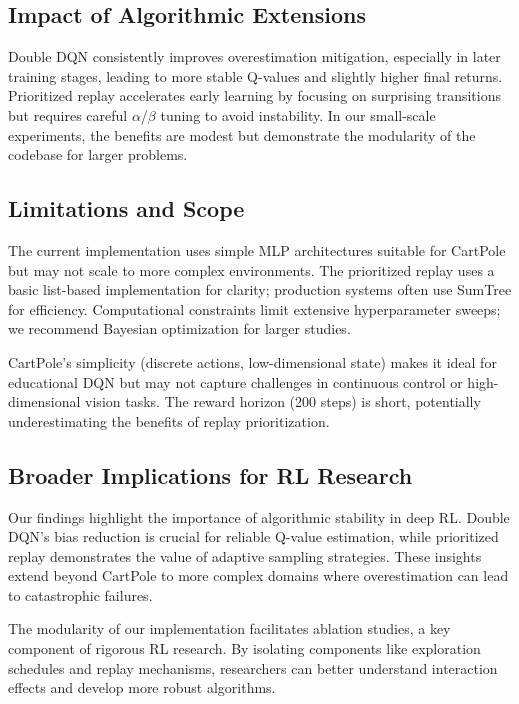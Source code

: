 \documentclass{IEEEtran}
\begin{document}
\subsection{Impact of Algorithmic Extensions}

Double DQN consistently improves overestimation mitigation, especially in later training stages, leading to more stable Q-values and slightly higher final returns. Prioritized replay accelerates early learning by focusing on surprising transitions but requires careful $\alpha$/$\beta$ tuning to avoid instability. In our small-scale experiments, the benefits are modest but demonstrate the modularity of the codebase for larger problems.

\subsection{Limitations and Scope}

The current implementation uses simple MLP architectures suitable for CartPole but may not scale to more complex environments. The prioritized replay uses a basic list-based implementation for clarity; production systems often use SumTree for efficiency. Computational constraints limit extensive hyperparameter sweeps; we recommend Bayesian optimization for larger studies.

CartPole's simplicity (discrete actions, low-dimensional state) makes it ideal for educational DQN but may not capture challenges in continuous control or high-dimensional vision tasks. The reward horizon (200 steps) is short, potentially underestimating the benefits of replay prioritization.

\subsection{Broader Implications for RL Research}

Our findings highlight the importance of algorithmic stability in deep RL. Double DQN's bias reduction is crucial for reliable Q-value estimation, while prioritized replay demonstrates the value of adaptive sampling strategies. These insights extend beyond CartPole to more complex domains where overestimation can lead to catastrophic failures.

The modularity of our implementation facilitates ablation studies, a key component of rigorous RL research. By isolating components like exploration schedules and replay mechanisms, researchers can better understand interaction effects and develop more robust algorithms.
\end{document}
